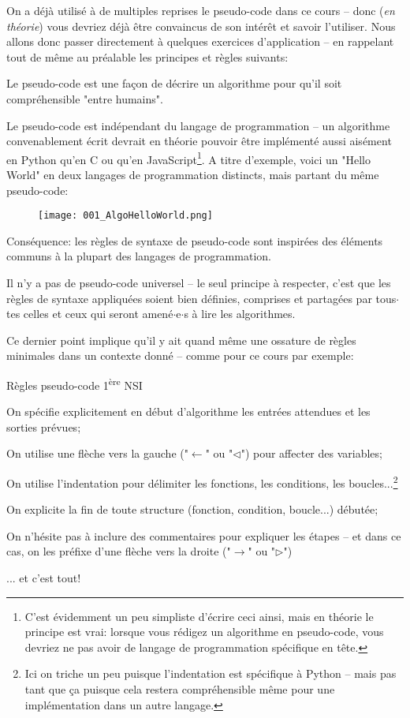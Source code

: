 \documentclass[12pt]{article}
\begin{document}
	On a déjà utilisé à de multiples reprises le pseudo-code dans ce cours -- donc (\textit{en théorie}) vous devriez déjà être convaincus de son intérêt et savoir l'utiliser. Nous allons donc passer directement à quelques exercices d'application -- en rappelant tout de même au préalable les principes et règles suivants:
	\begin{alphenum}
		\item Le pseudo-code est une façon de décrire un algorithme pour qu'il soit compréhensible "entre humains".
		\item Le pseudo-code est indépendant du langage de programmation -- un algorithme convenablement écrit devrait en théorie pouvoir être implémenté aussi aisément en Python qu'en C ou qu'en JavaScript\footnote{C'est évidemment un peu simpliste d'écrire ceci ainsi, mais en théorie le principe est vrai: lorsque vous rédigez un algorithme en pseudo-code, vous devriez ne pas avoir de langage de programmation spécifique en tête.}. A titre d'exemple, voici un "Hello World" en deux langages de programmation distincts, mais partant du même pseudo-code:
		\begin{figure}[H]
			\centering
			\texttt{[image: 001\_AlgoHelloWorld.png]}
		\end{figure}
		\item Conséquence: les règles de syntaxe de pseudo-code sont inspirées des éléments communs à la plupart des langages de programmation.
		\item Il n'y a pas de pseudo-code universel -- le seul principe à respecter, c'est que les règles de syntaxe appliquées soient bien définies, comprises et partagées par tous$\cdot$tes celles et ceux qui seront amené$\cdot$e$\cdot$s à lire les algorithmes.
	\end{alphenum}
	
	Ce dernier point implique qu'il y ait quand même une ossature de règles minimales dans un contexte donné -- comme pour ce cours par exemple:
	\begin{MonAmp}{Règles pseudo-code 1\textsuperscript{ère} NSI}
		\begin{alphenum}
			\item On spécifie explicitement en début d'algorithme les entrées attendues et les sorties prévues;
			\item On utilise une flèche vers la gauche ("$\leftarrow$" ou "$\lhd$") pour affecter des variables;
			\item On utilise l'indentation pour délimiter les fonctions, les conditions, les boucles...\footnote{Ici on triche un peu puisque l'indentation est spécifique à Python -- mais pas tant que ça puisque cela restera compréhensible même pour une implémentation dans un autre langage.}
			\item On explicite la fin de toute structure (fonction, condition, boucle...) débutée;
			\item On n'hésite pas à inclure des commentaires pour expliquer les étapes -- et dans ce cas, on les préfixe d'une flèche vers la droite ("$\rightarrow$" ou "$\rhd$")
			\item ... et c'est tout!
		\end{alphenum}
	\end{MonAmp}	 
	
\end{document}
